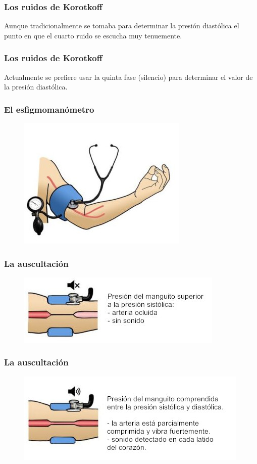 \documentclass[14pt]{beamer}
\begin{document}
\begin{frame}
\frametitle{Los ruidos de Korotkoff}
Aunque tradicionalmente se tomaba para determinar la presión diastólica el punto en que el cuarto ruido se escucha muy tenuemente.
\end{frame}
\begin{frame}
\frametitle{Los ruidos de Korotkoff}
Actualmente se prefiere usar la quinta fase (silencio) para determinar el valor de la presión diastólica.
\end{frame}
\begin{frame}
\frametitle{El esfigmomanómetro}
\vspace*{-1cm}
\begin{figure}
    \centering
    \includegraphics[scale=2]{Imagenes/Esfigmomanometro_02.jpg}
\end{figure}
\end{frame}
\begin{frame}
\frametitle{La auscultación}
\vspace*{-1cm}
\begin{figure}
    \centering
    \includegraphics[scale=2]{Imagenes/Esfigmomanometro_03.jpg}
\end{figure}
\end{frame}
\begin{frame}
\frametitle{La auscultación}
\vspace*{-1cm}
\begin{figure}
    \centering
    \includegraphics[scale=2]{Imagenes/Esfigmomanometro_04.jpg}
\end{figure}
\end{frame}
\end{document}
